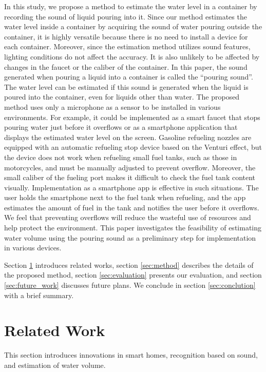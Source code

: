 \documentclass[sigconf,authordraft]{acmart}
\begin{document}
In this study, we propose a method to estimate the water level in a container by recording the sound of liquid pouring into it. Since our method estimates the water level inside a container by acquiring the sound of water pouring outside the container, it is highly versatile because there is no need to install a device for each container. Moreover, since the estimation method utilizes sound features, lighting conditions do not affect the accuracy. It is also unlikely to be affected by changes in the faucet or the caliber of the container. In this paper, the sound generated when pouring a liquid into a container is called the ``pouring sound''. The water level can be estimated if this sound is generated when the liquid is poured into the container, even for liquids other than water. The proposed method uses only a microphone as a sensor to be installed in various environments. For example, it could be implemented as a smart faucet that stops pouring water just before it overflows or as a smartphone application that displays the estimated water level on the screen. Gasoline refueling nozzles are equipped with an automatic refueling stop device based on the Venturi effect, but the device does not work when refueling small fuel tanks, such as those in motorcycles, and must be manually adjusted to prevent overflow. Moreover, the small caliber of the fueling port makes it difficult to check the fuel tank content visually. Implementation as a smartphone app is effective in such situations. The user holds the smartphone next to the fuel tank when refueling, and the app estimates the amount of fuel in the tank and notifies the user before it overflows. We feel that preventing overflows will reduce the wasteful use of resources and help protect the environment. This paper investigates the feasibility of estimating water volume using the pouring sound as a preliminary step for implementation in various devices.\par

Section \ref{sec:related} introduces related works, section \ref{sec:method} describes the details of the proposed method, section \ref{sec:evaluation} presents our evaluation, and section \ref{sec:future_work} discusses future plans. We conclude in section \ref{sec:conclution} with a brief summary.



\section{Related Work}
\label{sec:related}
This section introduces innovations in smart homes, recognition based on sound, and estimation of water volume.
\end{document}
